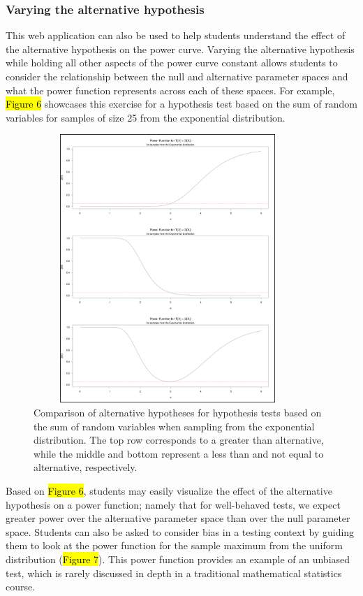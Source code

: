\documentclass{TISE}
\begin{document}
\subsubsection{Varying the alternative hypothesis}

This web application can also be used to help students understand the effect of the alternative hypothesis on the power curve. Varying the alternative hypothesis while holding all other aspects of the power curve constant allows students to consider the relationship between the null and alternative parameter spaces and what the power function represents across each of these spaces. For example, \hl{Figure 6} showcases this exercise for a hypothesis test based on the sum of random variables for samples of size 25 from the exponential distribution. 

\begin{figure}[H]
	\centering
	\includegraphics[height=4in,width=4in]{varyalt1.png}
	\caption{Comparison of alternative hypotheses for hypothesis tests based on the sum of random variables when sampling from the exponential distribution. The top row corresponds to a greater than alternative, while the middle and bottom represent a less than and not equal to alternative, respectively.}
\end{figure}

Based on \hl{Figure 6}, students may easily visualize the effect of the alternative hypothesis on a power function; namely that for well-behaved tests, we expect greater power over the alternative parameter space than over the null parameter space. Students can also be asked to consider bias in a testing context by guiding them to look at the power function for the sample maximum from the uniform distribution (\hl{Figure 7}). This power function provides an example of an unbiased test, which is rarely discussed in depth in a traditional mathematical statistics course. 
\end{document}
